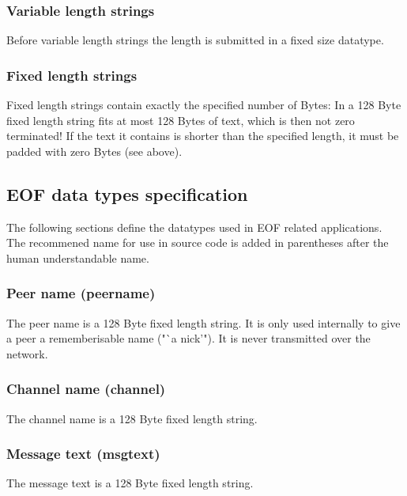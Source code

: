 \documentclass[12pt,a4paper]{article}
\begin{document}
\subsubsection{Variable length strings}
Before variable length strings the length is submitted in a fixed size
datatype.
\subsubsection{Fixed length strings}
Fixed length strings contain exactly the specified number of Bytes:
In a 128 Byte fixed length string fits at most 128 Bytes of text,
which is then not zero terminated!
If the text it contains is shorter than the specified length,
it must be padded with zero Bytes (see above).
\subsection{EOF data types specification}
The following sections define the datatypes used in EOF related
applications. The recommened name for use in source
code is added in parentheses after the human understandable name.
\subsubsection{Peer name (peername)}
The peer name is a 128 Byte fixed length string. It is only
used internally to give a peer a rememberisable name ("`a nick'").
It is never transmitted over the network.
\subsubsection{Channel name (channel)}
The channel name is a 128 Byte fixed length string.
\subsubsection{Message text (msgtext)}
The message text is a 128 Byte fixed length string.
\end{document}
